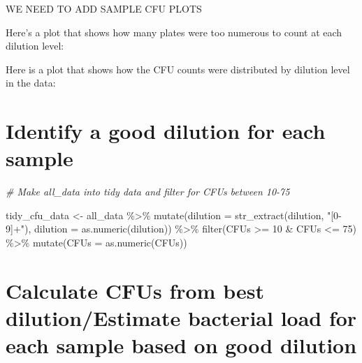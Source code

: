 \documentclass[
]{book}
\newenvironment{Shaded}{\begin{snugshade}}{\end{snugshade}}
\newcommand{\AttributeTok}[1]{\textcolor[rgb]{0.77,0.63,0.00}{#1}}
\newcommand{\CommentTok}[1]{\textcolor[rgb]{0.56,0.35,0.01}{\textit{#1}}}
\newcommand{\DecValTok}[1]{\textcolor[rgb]{0.00,0.00,0.81}{#1}}
\newcommand{\FunctionTok}[1]{\textcolor[rgb]{0.00,0.00,0.00}{#1}}
\newcommand{\NormalTok}[1]{#1}
\newcommand{\OtherTok}[1]{\textcolor[rgb]{0.56,0.35,0.01}{#1}}
\newcommand{\SpecialCharTok}[1]{\textcolor[rgb]{0.00,0.00,0.00}{#1}}
\newcommand{\StringTok}[1]{\textcolor[rgb]{0.31,0.60,0.02}{#1}}
\begin{document}
WE NEED TO ADD SAMPLE CFU PLOTS

Here's a plot that shows how many plates were too numerous to count at each
dilution level:

Here is a plot that shows how the CFU counts were distributed by dilution
level in the data:

\hypertarget{identify-a-good-dilution-for-each-sample}{%
\section{Identify a good dilution for each sample}\label{identify-a-good-dilution-for-each-sample}}

\begin{Shaded}
\begin{Highlighting}[]
\CommentTok{\# Make all\_data into tidy data and filter for CFUs between 10{-}75}
  
\NormalTok{tidy\_cfu\_data }\OtherTok{\textless{}{-}}\NormalTok{ all\_data }\SpecialCharTok{\%\textgreater{}\%}
  \FunctionTok{mutate}\NormalTok{(}\AttributeTok{dilution =} \FunctionTok{str\_extract}\NormalTok{(dilution, }\StringTok{"[0{-}9]+"}\NormalTok{),}
         \AttributeTok{dilution =} \FunctionTok{as.numeric}\NormalTok{(dilution)) }\SpecialCharTok{\%\textgreater{}\%}
  \FunctionTok{filter}\NormalTok{(CFUs }\SpecialCharTok{\textgreater{}=} \DecValTok{10} \SpecialCharTok{\&}\NormalTok{ CFUs }\SpecialCharTok{\textless{}=} \DecValTok{75}\NormalTok{) }\SpecialCharTok{\%\textgreater{}\%}
  \FunctionTok{mutate}\NormalTok{(}\AttributeTok{CFUs =} \FunctionTok{as.numeric}\NormalTok{(CFUs))}
\end{Highlighting}
\end{Shaded}

\hypertarget{calculate-cfus-from-best-dilutionestimate-bacterial-load-for-each-sample-based-on-good-dilution}{%
\section{Calculate CFUs from best dilution/Estimate bacterial load for each sample based on good dilution}\label{calculate-cfus-from-best-dilutionestimate-bacterial-load-for-each-sample-based-on-good-dilution}}
\end{document}
